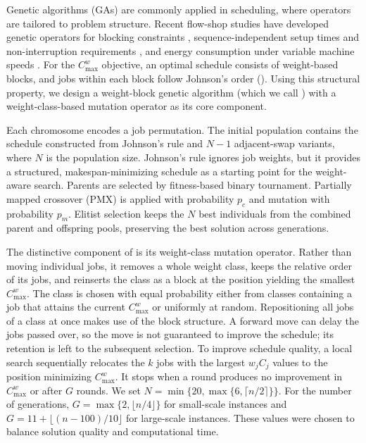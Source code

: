 \documentclass[12pt]{article}
\begin{document}
\begin{sloppypar}
        Genetic algorithms (GAs) are commonly applied in scheduling, where operators are tailored to problem structure. Recent flow-shop studies have developed genetic operators for blocking constraints \citep{deAthaydePrataFuchigami2024JIM},  sequence-independent setup times and non-interruption requirements \citep{QiaoWuHeLi2022ESA}, and energy consumption under variable machine speeds \citep{WangWangTianGong2023EAAI}. For the $C_{\max}^w$ objective, an optimal schedule consists of weight-based blocks, and jobs within each block follow Johnson's order (). Using this structural property, we design a weight-block genetic algorithm (which we call ) with a weight-class-based mutation operator as its core component.
        
        Each chromosome encodes a job permutation. The initial population contains the schedule constructed from Johnson's rule  and $N-1$ adjacent-swap variants, where $N$ is the population size. Johnson's rule ignores job weights, but it provides a structured, makespan-minimizing schedule as a starting point for the weight-aware search. Parents are selected by fitness-based binary tournament. Partially mapped crossover (PMX) is applied with probability $p_c$ and mutation with probability $p_m$. Elitist selection keeps the $N$ best individuals from the combined parent and offspring pools, preserving the best solution across generations.
        
        The distinctive component of  is its weight-class mutation operator. Rather than moving individual jobs, it removes a whole weight class, keeps the relative order of its jobs, and reinserts the class as a block at the position yielding the smallest $C_{\max}^w$. The class is chosen with equal probability either from classes containing a job that attains the current $C_{\max}^w$ or uniformly at random. Repositioning all jobs of a class at once makes use of the block structure. A forward move can delay the jobs passed over, so the move is not guaranteed to improve the schedule; its retention is left to the subsequent selection. To improve schedule quality, a local search sequentially relocates the $k$ jobs with the largest $w_j C_j$ values to the position minimizing $C_{\max}^w$. It stops when a round produces no improvement in $C_{\max}^w$ or after $G$ rounds. We set $N=\min\{20,\max\{6,\lceil n/2\rceil\}\}$. For the number of generations, $G=\max\{2,\lfloor n/4\rfloor\}$ for small-scale instances and $G=11+\lfloor(n-100)/10 \rfloor$ for large-scale instances. These values were chosen to balance solution quality and computational time. 
     

\end{sloppypar}
\end{document}
